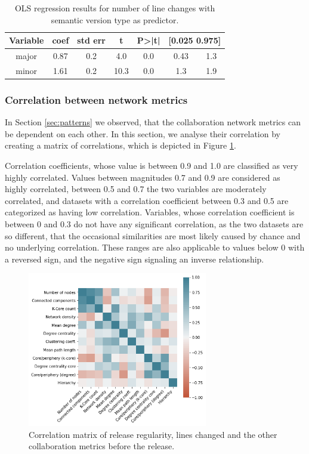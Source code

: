 \begin{table}
    \centering
        \begin{tabular}{|c|c|c|c|c|c|c|}
            \hline
            \textbf{Variable} & \textbf{coef} & \textbf{std err} & \textbf{t} & \textbf{P>|t|} & \multicolumn{2}{|c|}{\textbf{[0.025  0.975]}} \\
            \hline
            major & 0.87 & 0.2 & 4.0 & 0.0 & 0.43 & 1.3 \\
            minor & 1.61 & 0.2 & 10.3 & 0.0 & 1.3 & 1.9 \\
            \hline
        \end{tabular}
    \caption{OLS regression results for number of line changes with semantic version type as predictor.}
    \label{tab:linreg_lines}
\end{table}

\subsubsection{Correlation between network metrics}
In Section \ref{sec:patterns} we observed, that the collaboration network metrics can be dependent on each other. In this section, we analyse their correlation by creating a matrix of correlations, which is depicted in Figure \ref{fig:corr_matrix}.

Correlation coefficients, whose value is between 0.9 and 1.0 are classified as very highly correlated. Values between magnitudes 0.7 and 0.9 are considered as highly correlated, between 0.5 and 0.7 the two variables are moderately correlated, and datasets with a correlation coefficient between 0.3 and 0.5 are categorized as having low correlation. Variables, whose correlation coefficient is between 0 and 0.3 do not have any significant correlation, as the two datasets are so different, that the occasional similarities are most likely caused by chance and no underlying correlation. These ranges are also applicable to values below 0 with a reversed sign, and the negative sign signaling an inverse relationship.

\begin{figure}
    \centering
    \includegraphics[width=0.7\textwidth]{figures/quantitative/corr_matrix/corr_before.png}
    \caption{Correlation matrix of release regularity, lines changed and the other collaboration metrics before the release.}
    \label{fig:corr_matrix}
\end{figure}

